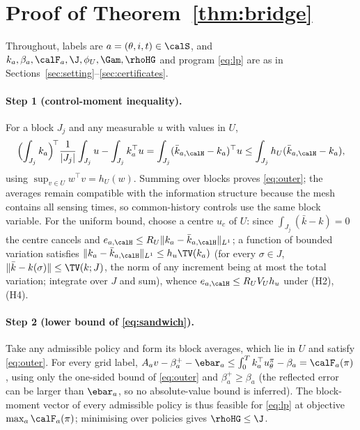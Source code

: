 \appendix

\section{Proof of Theorem~\ref{thm:bridge}}\label{app:bridge}

Throughout, labels are $a=(\theta,i,t)\in\calS$, and $k_a,\beta_a,\calF_a,\J,\phi_U,\Gam,\rhoHG$ and program \eqref{eq:lp} are as in Sections~\ref{sec:setting}--\ref{sec:certificates}.

\paragraph{Step 1 (control-moment inequality).}
For a block $J_j$ and any measurable $u$ with values in $U$,
\[
\Bigl(\int_{J_j}k_a\Bigr)^{\!\top}\frac1{|J_j|}\int_{J_j}u-\int_{J_j}k_a^\top u=\int_{J_j}(\bar k_{a,\calH}-k_a)^\top u\le\int_{J_j}h_U(\bar k_{a,\calH}-k_a),
\]
using $\sup_{v\in U}w^\top v=h_U(w)$. Summing over blocks proves \eqref{eq:outer}; the averages remain compatible with the information structure because the mesh contains all sensing times, so common-history controls use the same block variable. For the uniform bound, choose a centre $u_c$ of $U$: since $\int_{J_j}(\bar k-k)=0$ the centre cancels and $e_{a,\calH}\le R_U\|k_a-\bar k_{a,\calH}\|_{L^1}$; a function of bounded variation satisfies $\|k_a-\bar k_{a,\calH}\|_{L^1}\le h_u\TV(k_a)$ (for every $\sigma\in J$, $\|\bar k-k(\sigma)\|\le\TV(k;J)$, the norm of any increment being at most the total variation; integrate over $J$ and sum), whence $e_{a,\calH}\le R_UV_Uh_u$ under (H2), (H4).

\paragraph{Step 2 (lower bound of \eqref{eq:sandwich}).}
Take any admissible policy and form its block averages, which lie in $U$ and satisfy \eqref{eq:outer}. For every grid label, $A_av-\beta^+_a-\ebar_a\le\int_0^Tk_a^\top u^\pi_\theta-\beta_a=\calF_a(\pi)$, using only the one-sided bound of \eqref{eq:outer} and $\beta^+_a\ge\beta_a$ (the reflected error can be larger than $\ebar_a$, so no absolute-value bound is inferred). The block-moment vector of every admissible policy is thus feasible for \eqref{eq:lp} at objective $\max_a\calF_a(\pi)$; minimising over policies gives $\rhoHG\le\J$.

